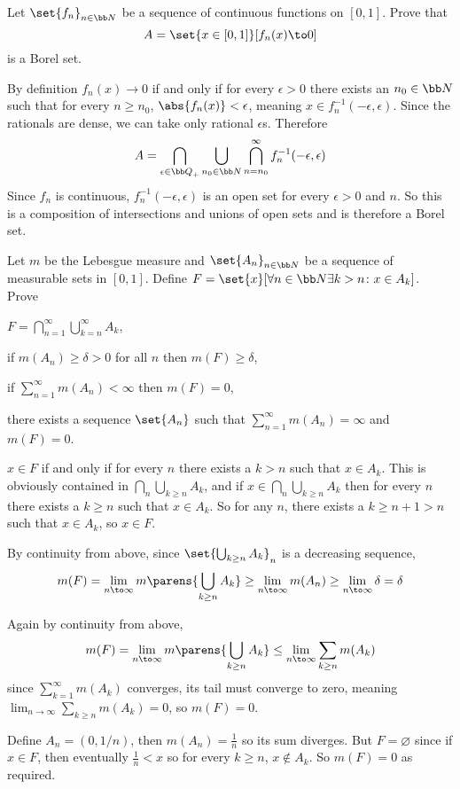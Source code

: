 \bexerc

    Let $\set{f_n}_{n\in{\bb N}}$ be a sequence of continuous functions on $[0,1]$.
    Prove that
    $$ A = \set{x\in[0,1]}[f_n(x)\to0] $$
    is a Borel set.

\eexerc

By definition $f_n(x)\to0$ if and only if for every $\epsilon>0$ there exists an $n_0\in{\bb N}$ such that for every $n\geq n_0$, $\abs{f_n(x)}<\epsilon$, meaning $x\in f_n^{-1}(-\epsilon,\epsilon)$.
Since the rationals are dense, we can take only rational $\epsilon$s.
Therefore
$$ A = \bigcap_{\epsilon\in{\bb Q}_+}\bigcup_{n_0\in{\bb N}}\bigcap_{n=n_0}^\infty f_n^{-1}(-\epsilon,\epsilon) $$
Since $f_n$ is continuous, $f_n^{-1}(-\epsilon,\epsilon)$ is an open set for every $\epsilon>0$ and $n$.
So this is a composition of intersections and unions of open sets and is therefore a Borel set.

\bexerc

    Let $m$ be the Lebesgue measure and $\set{A_n}_{n\in{\bb N}}$ be a sequence of measurable sets in $[0,1]$.
    Define $F=\set{x}[\forall n\in{\bb N}\exists k>n\colon x\in A_k]$.
    Prove
    \benum
        \item $F=\bigcap_{n=1}^\infty\bigcup_{k=n}^\infty A_k$,
        \item if $m(A_n)\geq\delta>0$ for all $n$ then $m(F)\geq\delta$,
        \item if $\sum_{n=1}^\infty m(A_n)<\infty$ then $m(F)=0$,
        \item there exists a sequence $\set{A_n}$ such that $\sum_{n=1}^\infty m(A_n)=\infty$ and $m(F)=0$.
    \eenum

\eexerc

\benum
    \item $x\in F$ if and only if for every $n$ there exists a $k>n$ such that $x\in A_k$.
    This is obviously contained in $\bigcap_n\bigcup_{k\geq n}A_k$, and if $x\in\bigcap_n\bigcup_{k\geq n}A_k$ then for every $n$ there exists a $k\geq n$ such that $x\in A_k$.
    So for any $n$, there exists a $k\geq n+1>n$ such that $x\in A_k$, so $x\in F$.
    \item By continuity from above, since $\set{\bigcup_{k\geq n}A_k}_n$ is a decreasing sequence,
    $$ m(F) = \lim_{n\to\infty}m\parens{\bigcup_{k\geq n}A_k} \geq \lim_{n\to\infty}m(A_n) \geq \lim_{n\to\infty}\delta = \delta $$
    \item Again by continuity from above,
    $$ m(F) = \lim_{n\to\infty}m\parens{\bigcup_{k\geq n}A_k} \leq \lim_{n\to\infty}\sum_{k\geq n}m(A_k) $$
    since $\sum_{k=1}^\infty m(A_k)$ converges, its tail must converge to zero, meaning $\lim_{n\to\infty}\sum_{k\geq n}m(A_k)=0$, so $m(F)=0$.
    \item Define $A_n=(0,1/n)$, then $m(A_n)=\frac1n$ so its sum diverges.
    But $F=\varnothing$ since if $x\in F$, then eventually $\frac1n<x$ so for every $k\geq n$, $x\notin A_k$.
    So $m(F)=0$ as required.
\eenum

